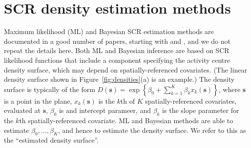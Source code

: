 \documentclass[10pt,a4paper]{article}
\begin{document}



\section{SCR density estimation methods}

Maximum likelihood (ML) and Bayesian SCR estimation methods are documented in a good number of papers, starting with \cite{Borchers+Efford:08} and \cite{Royle+Young:08}, and we do not repeat the details here. Both ML and Bayesian inference are based on SCR likelihood functions that include a component specifying the activity centre density surface, which may depend on spatially-referenced covariates. (The linear density surface shown in Figure~\ref{fig:densities}(a) is an example.) The density surface is typically of the form $D(\bm{s})=\exp\left\{\beta_0 + \sum_{k=1}^K\beta_kx_k(\bm{s})\right\}$, where $\bm{s}$ is a point in the plane, $x_k(\bm{s})$ is the $k$th of $K$ spatially-referenced covariates, evaluated at $\bm{s}$, $\beta_0$ is and intercept parameer, and $\beta_k$ is the slope parameter for the $k$th spatially-referenced covariate. ML and Bayesian methods are able to estimate $\beta_0,\ldots,\beta_K$, and hence to estimate the density surface. We refer to this as the ``estimated density surface''.
\end{document}
